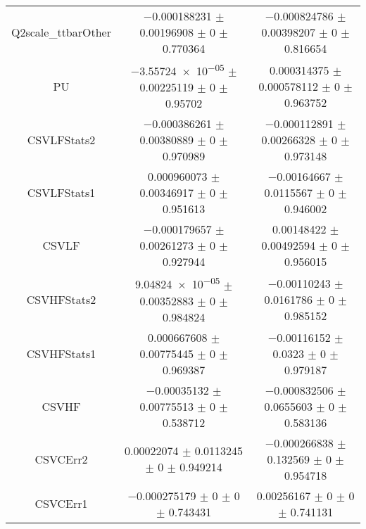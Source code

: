 \begin{table}
\begin{tabular}{ccc}
Q2scale\_ttbarOther & \num{-0.000188231} $\pm$ \num{0.00196908} $\pm$ \num{0} $\pm$ \num{0.770364} & \num{-0.000824786} $\pm$ \num{0.00398207} $\pm$ \num{0} $\pm$ \num{0.816654}\\
PU & \num{-3.55724e-05} $\pm$ \num{0.00225119} $\pm$ \num{0} $\pm$ \num{0.95702} & \num{0.000314375} $\pm$ \num{0.000578112} $\pm$ \num{0} $\pm$ \num{0.963752}\\
CSVLFStats2 & \num{-0.000386261} $\pm$ \num{0.00380889} $\pm$ \num{0} $\pm$ \num{0.970989} & \num{-0.000112891} $\pm$ \num{0.00266328} $\pm$ \num{0} $\pm$ \num{0.973148}\\
CSVLFStats1 & \num{0.000960073} $\pm$ \num{0.00346917} $\pm$ \num{0} $\pm$ \num{0.951613} & \num{-0.00164667} $\pm$ \num{0.0115567} $\pm$ \num{0} $\pm$ \num{0.946002}\\
CSVLF & \num{-0.000179657} $\pm$ \num{0.00261273} $\pm$ \num{0} $\pm$ \num{0.927944} & \num{0.00148422} $\pm$ \num{0.00492594} $\pm$ \num{0} $\pm$ \num{0.956015}\\
CSVHFStats2 & \num{9.04824e-05} $\pm$ \num{0.00352883} $\pm$ \num{0} $\pm$ \num{0.984824} & \num{-0.00110243} $\pm$ \num{0.0161786} $\pm$ \num{0} $\pm$ \num{0.985152}\\
CSVHFStats1 & \num{0.000667608} $\pm$ \num{0.00775445} $\pm$ \num{0} $\pm$ \num{0.969387} & \num{-0.00116152} $\pm$ \num{0.0323} $\pm$ \num{0} $\pm$ \num{0.979187}\\
CSVHF & \num{-0.00035132} $\pm$ \num{0.00775513} $\pm$ \num{0} $\pm$ \num{0.538712} & \num{-0.000832506} $\pm$ \num{0.0655603} $\pm$ \num{0} $\pm$ \num{0.583136}\\
CSVCErr2 & \num{0.00022074} $\pm$ \num{0.0113245} $\pm$ \num{0} $\pm$ \num{0.949214} & \num{-0.000266838} $\pm$ \num{0.132569} $\pm$ \num{0} $\pm$ \num{0.954718}\\
CSVCErr1 & \num{-0.000275179} $\pm$ \num{0} $\pm$ \num{0} $\pm$ \num{0.743431} & \num{0.00256167} $\pm$ \num{0} $\pm$ \num{0} $\pm$ \num{0.741131}\\
\bottomrule
\end{tabular}
\end{table}